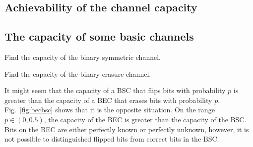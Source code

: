 \subsection{Achievability of the channel capacity}

\subsection{The capacity of some basic channels}
\fi
\begin{exercise}
Find the capacity of the binary symmetric channel.
\label{ex:cbsc}
\end{exercise}

\begin{exercise}\label{ex:cbec}
Find the capacity of the binary erasure channel.
\end{exercise}

It might seem that the capacity of a {BSC} that flips bits with probability $p$ is greater than the capacity of a {BEC} that erases bits with probability $p$. Fig.~\ref{fig:becbsc} shows that it is the opposite situation. On the range $p\in\left( 0,0.5\right)$, the capacity of the {BEC} is greater than the capacity of the {BSC}. Bits on the {BEC} are either perfectly known or perfectly unknown, however, it is not possible to distinguished flipped bits from correct bits in the {BSC}.

